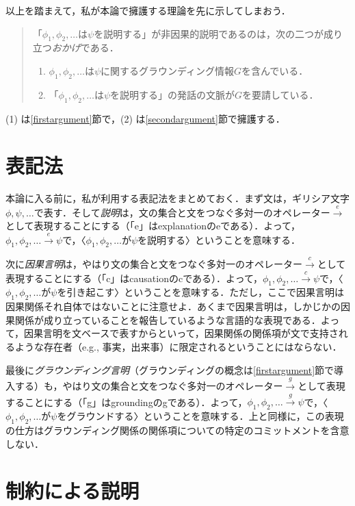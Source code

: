 \documentclass[twoside,14Q,dvipdfmx,uplatex]{jsarticle}
\theoremstyle{definition}
\begin{document}
以上を踏まえて，私が本論で擁護する理論を先に示してしまおう．
\begin{quote}
「$\phi_1, \phi_2, \ldots$は$\psi$を説明する」が非因果的説明であるのは，次の二つが成り立つ\emph{おかげ}である．
	\begin{enumerate}
	\item $\phi_1, \phi_2, \ldots$は$\psi$に関するグラウンディング情報$G$を含んでいる．	
	\item 「$\phi_1, \phi_2, \ldots$は$\psi$を説明する」の発話の文脈が$G$を要請している．
	\end{enumerate}
\end{quote}

\noindent(1) は\ref{firstargument}節で，(2) は\ref{secondargument}節で擁護する．

\section{表記法}
本論に入る前に，私が利用する表記法をまとめておく．まず文は，ギリシア文字$\phi, \psi, \ldots$で表す．そして\emph{説明}は，文の集合と文をつなぐ多対一のオペレーター$\xrightarrow{e}$として表現することにする（「e」はexplanationのeである）．よって，$\phi_1, \phi_2, \ldots\xrightarrow{e}\psi$で，〈$\phi_1, \phi_2, \ldots$が$\psi$を説明する〉ということを意味する．

次に\emph{因果言明}は，やはり文の集合と文をつなぐ多対一のオペレーター$\xrightarrow{c}$として表現することにする（「c」はcausationのcである）．よって，$\phi_1, \phi_2, \ldots\xrightarrow{c}\psi$で，〈$\phi_1, \phi_2, \ldots$が$\psi$を引き起こす〉ということを意味する．ただし，ここで因果言明は因果関係それ自体ではないことに注意せよ．あくまで因果言明は，しかじかの因果関係が成り立っていることを報告しているような言語的な表現である．よって，因果言明を文ベースで表すからといって，因果関係の関係項が文で支持されるような存在者（e.g., 事実，出来事）に限定されるということにはならない．

最後に\emph{グラウンディング言明}（グラウンディングの概念は\ref{firstargument}節で導入する）も，やはり文の集合と文をつなぐ多対一のオペレーター$\xrightarrow{g}$として表現することにする（「g」はgroundingのgである）．よって，$\phi_1, \phi_2, \ldots\xrightarrow{g}\psi$で，〈$\phi_1, \phi_2, \ldots$が$\psi$をグラウンドする〉ということを意味する．上と同様に，この表現の仕方はグラウンディング関係の関係項についての特定のコミットメントを含意しない．

\section{制約による説明}\label{explanationbyconstraint}
\end{document}

